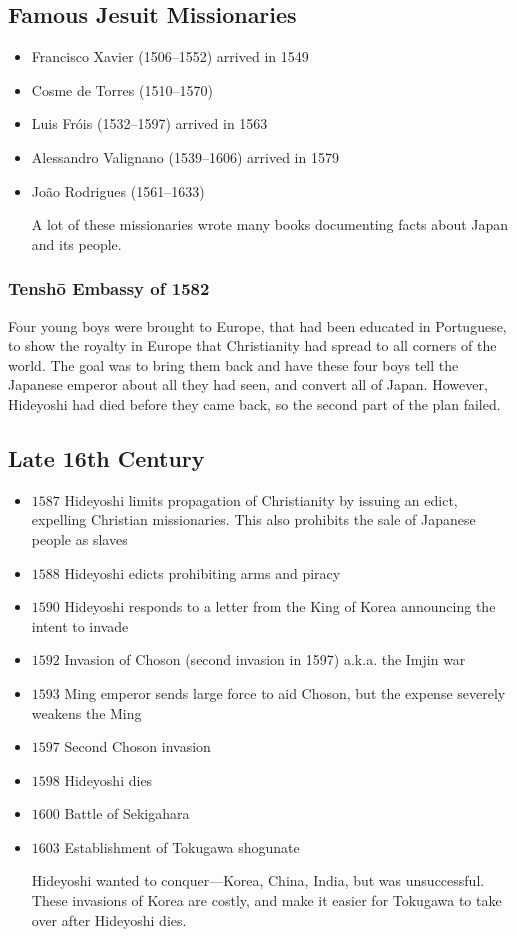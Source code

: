 \documentclass[class=article, crop=false]{standalone}
\begin{document}
  \subsection{Famous Jesuit Missionaries}
  \begin{itemize}
    \item Francisco Xavier (1506--1552) arrived in 1549
    \item Cosme de Torres (1510--1570)
    \item Luis Fr\' ois (1532--1597) arrived in 1563
    \item Alessandro Valignano (1539--1606) arrived in 1579
    \item Jo\~ao Rodrigues (1561--1633)
    \begin{note}{}
      A lot of these missionaries wrote many books documenting facts about Japan and its people.
    \end{note}
  \end{itemize}
  \subsubsection{Tensh\=o Embassy of 1582}
  Four young boys were brought to Europe, that had been educated in Portuguese, to show the royalty in Europe that Christianity had spread to all corners of the world. The goal was to bring them back and have these four boys tell the Japanese emperor about all they had seen, and convert all of Japan. However, Hideyoshi had died before they came back, so the second part of the plan failed.
  \subsection{Late 16th Century}
  \begin{itemize}
    \item $1587$ Hideyoshi limits propagation of Christianity by issuing an edict, expelling Christian missionaries. This also prohibits the sale of Japanese people as slaves
    \item $1588$ Hideyoshi edicts prohibiting arms and piracy
    \item $1590$ Hideyoshi responds to a letter from the King of Korea announcing the intent to invade
    \item $1592$ Invasion of Choson (second invasion in 1597) a.k.a. the Imjin war
    \item $1593$ Ming emperor sends large force to aid Choson, but the expense severely weakens the Ming
    \item $1597$ Second Choson invasion
    \item $1598$ Hideyoshi dies
    \item $1600$ Battle of Sekigahara
    \item $1603$ Establishment of Tokugawa shogunate
    \begin{note}{}
      Hideyoshi wanted to conquer---Korea, China, India, but was unsuccessful. These invasions of Korea are costly, and make it easier for Tokugawa to take over after Hideyoshi dies.
    \end{note}
  \end{itemize}
\end{document}
